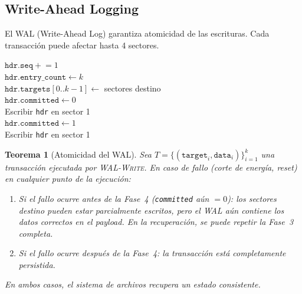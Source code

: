 \documentclass[11pt,twoside,openright]{book}
\theoremstyle{definition}
\theoremstyle{plain}
\newtheorem{theorem}{Teorema}[chapter]
\theoremstyle{remark}
\begin{document}
\subsection{Write-Ahead Logging}

El WAL (Write-Ahead Log) garantiza atomicidad de las escrituras. Cada
transacción puede afectar hasta 4 sectores.

\begin{algorithm}[H]
\caption{\textsc{WAL-Write}: Escritura atómica con WAL}
\label{alg:wal-write}
$\texttt{hdr.seq} \mathrel{+}= 1$ \\
$\texttt{hdr.entry\_count} \leftarrow k$ \\
$\texttt{hdr.targets}[0..k-1] \leftarrow$ sectores destino \\
$\texttt{hdr.committed} \leftarrow 0$ \\
Escribir \texttt{hdr} en sector 1 \\[4pt]
$\texttt{hdr.committed} \leftarrow 1$ \\
Escribir \texttt{hdr} en sector 1
\end{algorithm}

\begin{theorem}[Atomicidad del WAL]
\label{thm:wal-atomicity}
Sea $T = \{(\texttt{target}_i, \texttt{data}_i)\}_{i=1}^{k}$ una transacción
ejecutada por \textsc{WAL-Write}. En caso de fallo (corte de energía, reset)
en cualquier punto de la ejecución:
\begin{enumerate}
    \item Si el fallo ocurre antes de la Fase~4 (\texttt{committed} aún $= 0$):
          los sectores destino pueden estar parcialmente escritos, pero el WAL
          aún contiene los datos correctos en el payload. En la recuperación,
          se puede repetir la Fase~3 completa.
    \item Si el fallo ocurre después de la Fase~4: la transacción está
          completamente persistida.
\end{enumerate}
En ambos casos, el sistema de archivos recupera un estado consistente.
\end{theorem}
\end{document}
